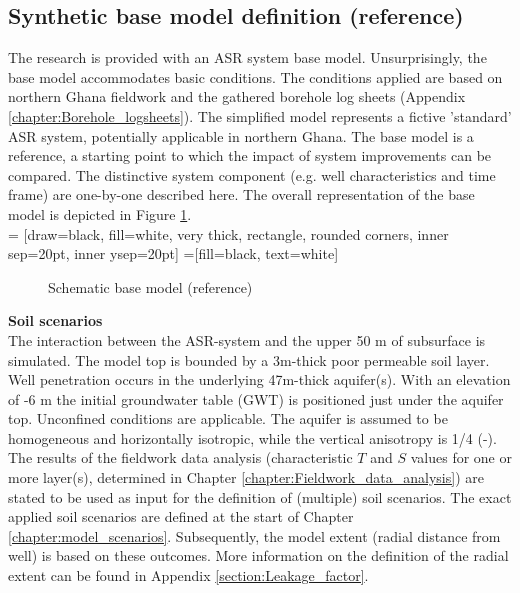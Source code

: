 \subsection{Synthetic base model definition (reference)} 
\label{base_model_def}
The research is provided with an ASR system base model. Unsurprisingly, the base model accommodates basic conditions. The conditions applied are based on northern Ghana fieldwork and the gathered borehole log sheets (Appendix \ref{chapter:Borehole_logsheets}). The simplified model represents a fictive 'standard' ASR system, potentially applicable in northern Ghana. The base model is a reference, a starting point to which the impact of system improvements can be compared. The distinctive system component (e.g. well characteristics and time frame) are one-by-one described here. The overall representation of the base model is depicted in Figure \ref{fig:Schematic_base_model_empty}. \\

 = [draw=black, fill=white, very thick,
    rectangle, rounded corners, inner sep=20pt, inner ysep=20pt]
 =[fill=black, text=white]

\begin{figure}[h]
\centering
{}
\captionsetup{justification=centering}
\caption{Schematic base model (reference)}
\label{fig:Schematic_base_model_empty}
\end{figure}

\textbf{Soil scenarios} \\
The interaction between the ASR-system and the upper 50 m of subsurface is simulated. The model top is bounded by a 3m-thick poor permeable soil layer. Well penetration occurs in the underlying 47m-thick aquifer(s). With an elevation of -6 m the initial groundwater table (GWT) is positioned just under the aquifer top. Unconfined conditions are applicable. The aquifer is assumed to be homogeneous and horizontally isotropic, while the vertical anisotropy is 1/4 (-). The results of the fieldwork data analysis (characteristic $T$ and $S$ values for one or more layer(s), determined in Chapter \ref{chapter:Fieldwork_data_analysis}) are stated to be used as input for the definition of (multiple) soil scenarios. The exact applied soil scenarios are defined at the start of Chapter \ref{chapter:model_scenarios}. Subsequently, the model extent (radial distance from well) is based on these outcomes. More information on the definition of the radial extent can be found in Appendix \ref{section:Leakage_factor}.\\

